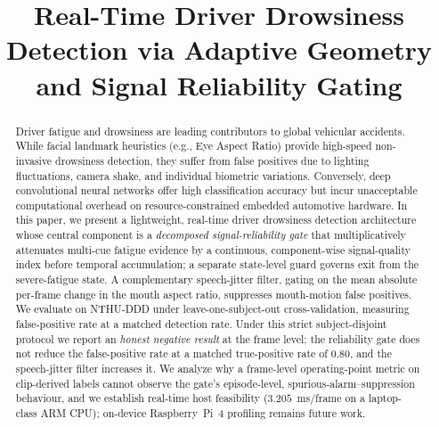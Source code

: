 \documentclass[10pt,conference]{IEEEtran}
\begin{document}
\title{Real-Time Driver Drowsiness Detection via Adaptive Geometry and Signal Reliability Gating}

\author{
}

\maketitle

\begin{abstract}
Driver fatigue and drowsiness are leading contributors to global vehicular accidents. While facial landmark heuristics (e.g., Eye Aspect Ratio) provide high-speed non-invasive drowsiness detection, they suffer from false positives due to lighting fluctuations, camera shake, and individual biometric variations. Conversely, deep convolutional neural networks offer high classification accuracy but incur unacceptable computational overhead on resource-constrained embedded automotive hardware. In this paper, we present a lightweight, real-time driver drowsiness detection architecture whose central component is a \emph{decomposed signal-reliability gate} that multiplicatively attenuates multi-cue fatigue evidence by a continuous, component-wise signal-quality index before temporal accumulation; a separate state-level guard governs exit from the severe-fatigue state. A complementary speech-jitter filter, gating on the mean absolute per-frame change in the mouth aspect ratio, suppresses mouth-motion false positives. We evaluate on NTHU-DDD under leave-one-subject-out cross-validation, measuring false-positive rate at a matched detection rate. Under this strict subject-disjoint protocol we report an \emph{honest negative result} at the frame level: the reliability gate does not reduce the false-positive rate at a matched true-positive rate of $0.80$, and the speech-jitter filter increases it. We analyze why a frame-level operating-point metric on clip-derived labels cannot observe the gate's episode-level, spurious-alarm–suppression behaviour, and we establish real-time host feasibility ($3.205$~ms/frame on a laptop-class ARM CPU); on-device Raspberry~Pi~4 profiling remains future work.
\end{abstract}
\end{document}
